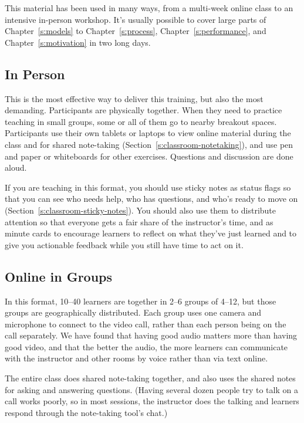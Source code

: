 This material has been used in many ways,
from a multi-week online class to an intensive in-person workshop.
It's usually possible to cover large parts of Chapter~\ref{s:models} to Chapter~\ref{s:process},
Chapter~\ref{s:performance},
and Chapter~\ref{s:motivation} in two long days.

\subsection*{In Person}

This is the most effective way to deliver this training,
but also the most demanding.
Participants are physically together. When they need to
practice teaching in small groups, some or all of them go to nearby
breakout spaces. Participants use their own tablets or laptops to view
online material during the class and for shared note-taking
(Section~\ref{s:classroom-notetaking}), and use pen and paper or
whiteboards for other exercises. Questions and discussion are done
aloud.

If you are teaching in this format, you should use sticky notes as
status flags so that you can see who needs help, who has questions,
and who's ready to move on (Section~\ref{s:classroom-sticky-notes}). You
should also use them to distribute attention so that everyone gets a
fair share of the instructor's time, and as minute cards to encourage
learners to reflect on what they've just learned and to give you
actionable feedback while you still have time to act on it.

\subsection*{Online in Groups}

In this format, 10--40 learners are together in 2--6 groups of 4--12, but
those groups are geographically distributed. Each group uses one camera
and microphone to connect to the video call, rather than each person
being on the call separately. We have found that having good audio
matters more than having good video, and that the better the audio, the
more learners can communicate with the instructor and other rooms by
voice rather than via text online.

The entire class does shared note-taking together, and also uses the
shared notes for asking and answering questions. (Having several dozen
people try to talk on a call works poorly, so in most sessions, the
instructor does the talking and learners respond through the note-taking
tool's chat.)


